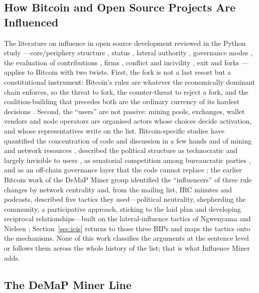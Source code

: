 \subsection{How Bitcoin and Open Source Projects Are Influenced}

The literature on influence in open source development reviewed in the Python study \cite{influenceMinerPython}---core/periphery structure \cite{mockus2002, crowston2005}, status \cite{stewart2005}, lateral authority \cite{dahlander2011}, governance modes \cite{omahony2007, markus2007, shaikh2017}, the evaluation of contributions \cite{tsay2014, alami2020}, firms \cite{schaarschmidt2015, zhang2022}, conflict and incivility \cite{filippova2016, ferreira2021, miller2022}, exit and forks \cite{hirschman1970, robles2012}---applies to Bitcoin with two twists. First, the fork is not a last resort but a constitutional instrument: Bitcoin's rules are whatever the economically dominant chain enforces, so the threat to fork, the counter-threat to reject a fork, and the coalition-building that precedes both are the ordinary currency of its hardest decisions \cite{bier2021, bohme2015}. Second, the ``users'' are not passive: mining pools, exchanges, wallet vendors and node operators are organised actors whose choices decide activation, and whose representatives write on the list. Bitcoin-specific studies have quantified the concentration of code and discussion in a few hands \cite{azouvi2018} and of mining and network resources \cite{gencer2018, gervais2014}, described the political structure as technocratic and largely invisible to users \cite{defilippi2016}, as senatorial competition among bureaucratic parties \cite{parkin2019}, and as an off-chain governance layer that the code cannot replace \cite{reijers2021}; the earlier Bitcoin work of the DeMaP Miner group identified the ``influencers'' of three rule changes by network centrality and, from the mailing list, IRC minutes and podcasts, described five tactics they used---political neutrality, shepherding the community, a participative approach, sticking to the laid plan and developing reciprocal relationships---built on the lateral-influence tactics of Ngwenyama and Nielsen \cite{thapa2021bitcoin, ngwenyama2014}; Section~\ref{sec:icis} returns to those three BIPs and maps the tactics onto the mechanisms. None of this work classifies the arguments at the sentence level or follows them across the whole history of the list; that is what Influence Miner adds.

\subsection{The DeMaP Miner Line}

